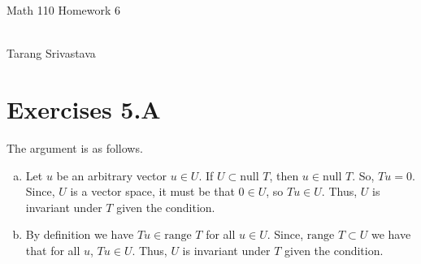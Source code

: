 \documentclass[10pt, twocolumn]{article}
\author{Tarang Srivastava}
\newcommand{\nul}{\text{null }}
\newcommand{\range}{\text{range }}
\newcommand{\makechaptertitle}[1]{
\begin{center}
	\begin{large}
		#1
	\end{large}
	\begin{small}
		\\Tarang Srivastava
	\end{small}
\end{center}
}
\begin{document}
\makechaptertitle{Math 110 Homework 6}

\section{Exercises 5.A}
\begin{q}[1]
	The argument is as follows.
	\begin{enumerate}[(a)]
		\item Let $ u $ be an arbitrary vector $ u \in U $.
		If $ U \subset \nul T $, then $ u \in \nul T $. 
		So, $ Tu = 0 $. Since, $ U $ is a vector space, it must be that $ 0 \in U $, so $ Tu \in U $.
		Thus, $ U $ is invariant under $ T $ given the condition.
		\item By definition we have $ Tu \in \range T $ for all $ u \in U $. 
		Since, $ \range T \subset U $ we have that for all $ u $, $ Tu \in U $. 
		Thus, $ U $ is invariant under $ T $ given the condition.
	\end{enumerate}
\end{q}
\end{document}
